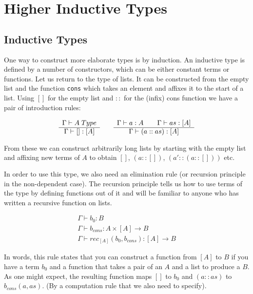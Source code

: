 \section{Higher Inductive Types}\label{sec:HITs}
\subsection{Inductive Types}
One way to construct more elaborate types is by induction. An inductive type is
defined by a number of constructors, which can be either constant terms or
functions. Let us return to the type of lists. It can be constructed from the
empty list and the function \texttt{cons} which takes an element and affixes it
to the start of a list. Using $[]$ for the empty list and $::$ for the (infix)
cons function we have a pair of introduction rules:

\[
  \begin{array}[t]{c}
    \Gamma \vdash A \; Type\\
    \hline
    \Gamma \vdash [] : [A]\\
  \end{array}
  \qquad
  \begin{array}[t]{c}
    \Gamma \vdash a:A \qquad \Gamma \vdash as:[A] \\
    \hline
    \Gamma \vdash ( a :: as ) : [A]
  \end{array}
\]

From these we can construct arbitrarily long lists by starting with the empty
list and affixing new terms of $A$ to obtain $[]$, $(a::[])$, $(a'::(a::[]))$ etc.

In order to use this type, we also need an elimination rule (or
recursion principle in the non-dependent case). The recursion principle tells us
how to use terms of the type by defining functions out of it and will be
familiar to anyone who has written a recursive function on lists.

\[
  \begin{array}{c}
    \Gamma \vdash b_0:B\\
    \Gamma \vdash b_{cons}: A \times [A] \rightarrow B\\
    \hline
    \Gamma \vdash rec_{[A]} (b_0, b_{cons}) : [A] \rightarrow B
  \end{array}
\]

In words, this rule states that you can construct a function from $[A]$ to $B$
if you have a term $b_0$ and a function that takes a pair of an $A$ and a list
to produce a $B$. As one might expect, the resulting function maps $[]$ to $b_0$
and $(a::as)$ to $b_{cons}(a,as)$. (By a computation rule that we also need to
specify).

